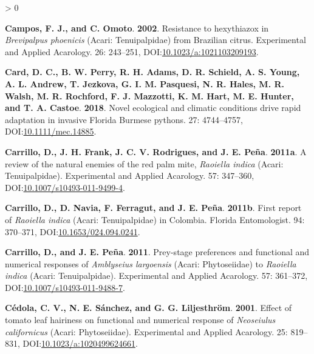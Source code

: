 \documentclass{ufdissertation}[overrideChapters] %
\newlength{\cslhangindent}
\newenvironment{CSLReferences}[2] %
 {%
  \setlength{\parindent}{0pt}
  \ifodd #1 \everypar{\setlength{\hangindent}{\cslhangindent}}\ignorespaces\fi
  \ifnum #2 > 0
  \setlength{\parskip}{#2\baselineskip}
  \fi
 }%
 {}
\begin{document}
{\begin{CSLReferences}{1}{1}
\leavevmode{}%
\textbf{Campos, F. J., and C. Omoto}. \textbf{2002}. Resistance to hexythiazox in {\emph{Brevipalpus phoenicis}} ({Acari}: {Tenuipalpidae}) from {Brazilian} citrus. Experimental and Applied Acarology. 26: 243--251, DOI:\href{https://doi.org/10.1023/a:1021103209193}{10.1023/a:1021103209193}.

\leavevmode{}%
\textbf{Card, D. C., B. W. Perry, R. H. Adams, D. R. Schield, A. S. Young, A. L. Andrew, T. Jezkova, G. I. M. Pasquesi, N. R. Hales, M. R. Walsh, M. R. Rochford, F. J. Mazzotti, K. M. Hart, M. E. Hunter, and T. A. Castoe}. \textbf{2018}. Novel ecological and climatic conditions drive rapid adaptation in invasive {Florida} {Burmese} pythons. 27: 4744--4757, DOI:\href{https://doi.org/10.1111/mec.14885}{10.1111/mec.14885}.

\leavevmode{}%
\textbf{Carrillo, D., J. H. Frank, J. C. V. Rodrigues, and J. E. Peña}. \textbf{2011a}. A review of the natural enemies of the red palm mite, {\emph{Raoiella indica}} ({Acari}: {Tenuipalpidae}). Experimental and Applied Acarology. 57: 347--360, DOI:\href{https://doi.org/10.1007/s10493-011-9499-4}{10.1007/s10493-011-9499-4}.

\leavevmode{}%
\textbf{Carrillo, D., D. Navia, F. Ferragut, and J. E. Peña}. \textbf{2011b}. First report of {\emph{Raoiella indica}} ({Acari}: {Tenuipalpidae}) in {Colombia}. Florida Entomologist. 94: 370--371, DOI:\href{https://doi.org/10.1653/024.094.0241}{10.1653/024.094.0241}.

\leavevmode{}%
\textbf{Carrillo, D., and J. E. Peña}. \textbf{2011}. Prey-stage preferences and functional and numerical responses of {\emph{Amblyseius largoensis}} ({Acari: Phytoseiidae}) to {\emph{Raoiella indica}} ({Acari}: {Tenuipalpidae}). Experimental and Applied Acarology. 57: 361--372, DOI:\href{https://doi.org/10.1007/s10493-011-9488-7}{10.1007/s10493-011-9488-7}.

\leavevmode{}%
\textbf{Cédola, C. V., N. E. Sánchez, and G. G. Liljesthröm}. \textbf{2001}. Effect of tomato leaf hairiness on functional and numerical response of {\emph{Neoseiulus californicus}} ({Acari}: {Phytoseiidae}). Experimental and Applied Acarology. 25: 819--831, DOI:\href{https://doi.org/10.1023/a:1020499624661}{10.1023/a:1020499624661}.


\end{CSLReferences}}
\end{document}
